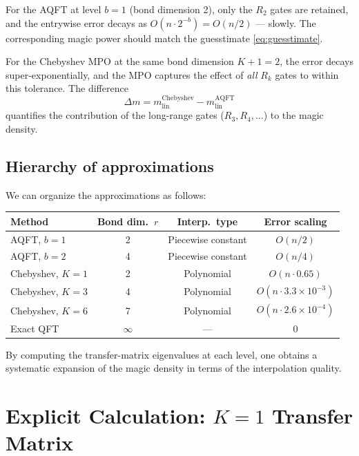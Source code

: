 \documentclass[11pt,a4paper]{article}
\theoremstyle{definition}
\theoremstyle{remark}
\newcommand{\AQFT}{\mathrm{AQFT}}
\begin{document}
For the AQFT at level $b=1$ (bond dimension 2), only the $R_2$ gates are retained, and the entrywise error decays as $O(n\cdot 2^{-b}) = O(n/2)$ --- slowly.  The corresponding magic power should match the guesstimate \eqref{eq:guesstimate}.

For the Chebyshev MPO at the same bond dimension $K+1=2$, the error decays super-exponentially, and the MPO captures the effect of \emph{all} $R_k$ gates to within this tolerance.  The difference
\begin{equation}
  \Delta m = m_{\mathrm{lin}}^{\mathrm{Chebyshev}} - m_{\mathrm{lin}}^{\AQFT}
\end{equation}
quantifies the contribution of the long-range gates ($R_3, R_4, \ldots$) to the magic density.

\subsection{Hierarchy of approximations}

We can organize the approximations as follows:

\medskip
\begin{center}
\renewcommand{\arraystretch}{1.4}
\begin{tabular}{lccc}
  \toprule
  Method & Bond dim.\ $r$ & Interp.\ type & Error scaling \\
  \midrule
  AQFT, $b=1$ & 2 & Piecewise constant & $O(n/2)$ \\
  AQFT, $b=2$ & 4 & Piecewise constant & $O(n/4)$ \\
  Chebyshev, $K=1$ & 2 & Polynomial & $O(n\cdot 0.65)$ \\
  Chebyshev, $K=3$ & 4 & Polynomial & $O(n\cdot 3.3\times10^{-3})$ \\
  Chebyshev, $K=6$ & 7 & Polynomial & $O(n\cdot 2.6\times10^{-4})$ \\
  Exact QFT & $\infty$ & --- & 0 \\
  \bottomrule
\end{tabular}
\end{center}
\medskip

By computing the transfer-matrix eigenvalues at each level, one obtains a systematic expansion of the magic density in terms of the interpolation quality.

\section{Explicit Calculation: $K=1$ Transfer Matrix}
\label{sec:explicit_K1}
\end{document}
